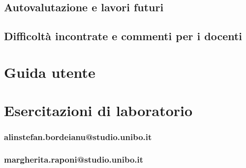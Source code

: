 \documentclass[a4paper,12pt]{report}
\begin{document}
\section{Autovalutazione e lavori futuri}

\section{Difficoltà incontrate e commenti per i docenti}



\appendix

\chapter{Guida utente}

\chapter{Esercitazioni di laboratorio}

\subsection{alinstefan.bordeianu@studio.unibo.it}

\subsection{margherita.raponi@studio.unibo.it}
\end{document}
